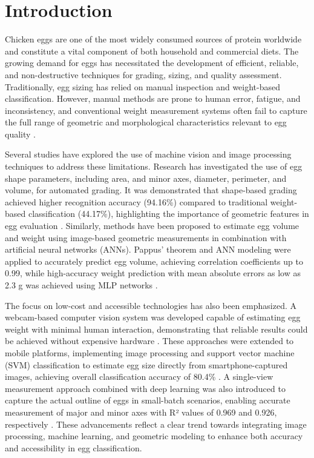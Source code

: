 \documentclass[conference]{IEEEtran}
\begin{document}
	
	\section{Introduction}
	Chicken eggs are one of the most widely consumed sources of protein worldwide and constitute a vital component of both household and commercial diets. The growing demand for eggs has necessitated the development of efficient, reliable, and non-destructive techniques for grading, sizing, and quality assessment. Traditionally, egg sizing has relied on manual inspection and weight-based classification. However, manual methods are prone to human error, fatigue, and inconsistency, and conventional weight measurement systems often fail to capture the full range of geometric and morphological characteristics relevant to egg quality \cite{asadi2010}\cite{bondoc2021}.
	
	Several studies have explored the use of machine vision and image processing techniques to address these limitations. Research has investigated the use of egg shape parameters, including area, and minor axes, diameter, perimeter, and volume, for automated grading. It was demonstrated that shape-based grading achieved higher recognition accuracy (94.16\%) compared to traditional weight-based classification (44.17\%), highlighting the importance of geometric features in egg evaluation \cite{nasir2018}. Similarly, methods have been proposed to estimate egg volume and weight using image-based geometric measurements in combination with artificial neural networks (ANNs). Pappus’ theorem and ANN modeling were applied to accurately predict egg volume, achieving correlation coefficients up to 0.99, while high-accuracy weight prediction with mean absolute errors as low as 2.3 g was achieved using MLP networks \cite{soltani2015}\cite{asadi2010}\cite{nasir2018}.
	
	The focus on low-cost and accessible technologies has also been emphasized. A webcam-based computer vision system was developed capable of estimating egg weight with minimal human interaction, demonstrating that reliable results could be achieved without expensive hardware \cite{2018}. These approaches were extended to mobile platforms, implementing image processing and support vector machine (SVM) classification to estimate egg size directly from smartphone-captured images, achieving overall classification accuracy of 80.4\% \cite{thipakorn2017}. A single-view measurement approach combined with deep learning was also introduced to capture the actual outline of eggs in small-batch scenarios, enabling accurate measurement of major and minor axes with R² values of 0.969 and 0.926, respectively \cite{liu2023}. These advancements reflect a clear trend towards integrating image processing, machine learning, and geometric modeling to enhance both accuracy and accessibility in egg classification.
	
\end{document}
